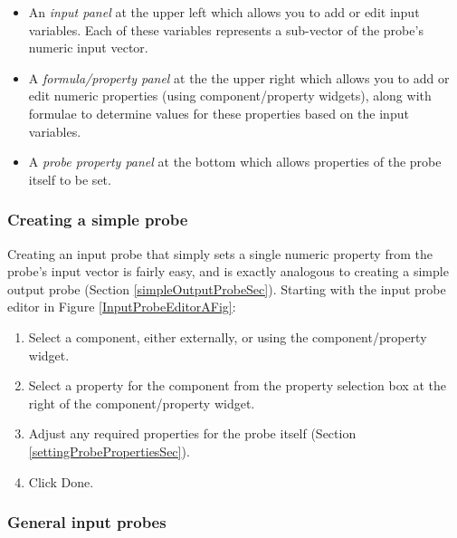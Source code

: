 \documentclass{article}
\begin{document}
\begin{itemize}

\item An {\it input panel} at the upper left which allows you
to add or edit input variables. Each of these variables represents
a sub-vector of the probe's numeric input vector.

\item A {\it formula/property panel} at the the upper right which allows you
to add or edit numeric properties (using component/property widgets),
along with formulae to determine values for these properties based on
the input variables.

\item A {\it probe property panel} at the bottom which allows properties of
the probe itself to be set.

\end{itemize}

\subsubsection{Creating a simple probe}
\label{simpleInputProbeSec}

Creating an input probe that simply sets a single numeric
property from the probe's input vector is fairly easy, and
is exactly analogous to creating a simple output probe
(Section \ref{simpleOutputProbeSec}). Starting with
the input probe editor in Figure \ref{InputProbeEditorAFig}:

\begin{enumerate}

\item Select a component, either externally, or using the
component/property widget.

\item Select a property for the component from the property
selection box at the right of the component/property widget.

\item Adjust any required properties for the probe itself 
(Section \ref{settingProbePropertiesSec}).

\item Click {\sf Done}.

\end{enumerate}

\subsubsection{General input probes}
\end{document}
